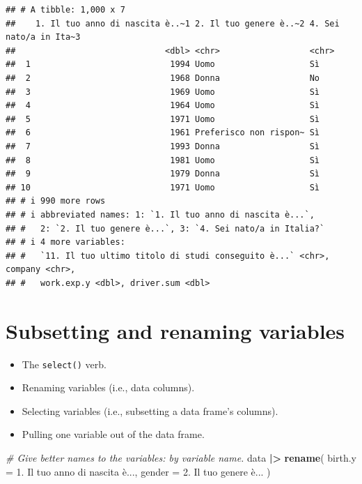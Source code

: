 \documentclass[
]{book}
\newenvironment{Shaded}{\begin{snugshade}}{\end{snugshade}}
\newcommand{\AttributeTok}[1]{\textcolor[rgb]{0.13,0.29,0.53}{#1}}
\newcommand{\CommentTok}[1]{\textcolor[rgb]{0.56,0.35,0.01}{\textit{#1}}}
\newcommand{\FunctionTok}[1]{\textcolor[rgb]{0.13,0.29,0.53}{\textbf{#1}}}
\newcommand{\NormalTok}[1]{#1}
\newcommand{\SpecialCharTok}[1]{\textcolor[rgb]{0.81,0.36,0.00}{\textbf{#1}}}
\newcommand{\StringTok}[1]{\textcolor[rgb]{0.31,0.60,0.02}{#1}}
\providecommand{\tightlist}{%
  \setlength{\itemsep}{0pt}\setlength{\parskip}{0pt}}
\begin{document}
\begin{verbatim}
## # A tibble: 1,000 x 7
##    1. Il tuo anno di nascita è..~1 2. Il tuo genere è..~2 4. Sei nato/a in Ita~3
##                              <dbl> <chr>                  <chr>                 
##  1                            1994 Uomo                   Sì                    
##  2                            1968 Donna                  No                    
##  3                            1969 Uomo                   Sì                    
##  4                            1964 Uomo                   Sì                    
##  5                            1971 Uomo                   Sì                    
##  6                            1961 Preferisco non rispon~ Sì                    
##  7                            1993 Donna                  Sì                    
##  8                            1981 Uomo                   Sì                    
##  9                            1979 Donna                  Sì                    
## 10                            1971 Uomo                   Sì                    
## # i 990 more rows
## # i abbreviated names: 1: `1. Il tuo anno di nascita è...`,
## #   2: `2. Il tuo genere è...`, 3: `4. Sei nato/a in Italia?`
## # i 4 more variables:
## #   `11. Il tuo ultimo titolo di studi conseguito è...` <chr>, company <chr>,
## #   work.exp.y <dbl>, driver.sum <dbl>
\end{verbatim}

\hypertarget{subsetting-and-renaming-variables}{%
\section{Subsetting and renaming variables}\label{subsetting-and-renaming-variables}}

\begin{itemize}
\tightlist
\item
  The \texttt{select()} verb.
\item
  Renaming variables (i.e., data columns).
\item
  Selecting variables (i.e., subsetting a data frame's columns).
\item
  Pulling one variable out of the data frame.
\end{itemize}

\begin{Shaded}
\begin{Highlighting}[]
\CommentTok{\# Give better names to the variables: by variable name.}
\NormalTok{data }\SpecialCharTok{|\textgreater{}} 
  \FunctionTok{rename}\NormalTok{(}
    \AttributeTok{birth.y =} \StringTok{\textasciigrave{}}\AttributeTok{1. Il tuo anno di nascita è...}\StringTok{\textasciigrave{}}\NormalTok{,}
    \AttributeTok{gender =} \StringTok{\textasciigrave{}}\AttributeTok{2. Il tuo genere è...}\StringTok{\textasciigrave{}}
\NormalTok{  )}
\end{Highlighting}
\end{Shaded}
\end{document}
